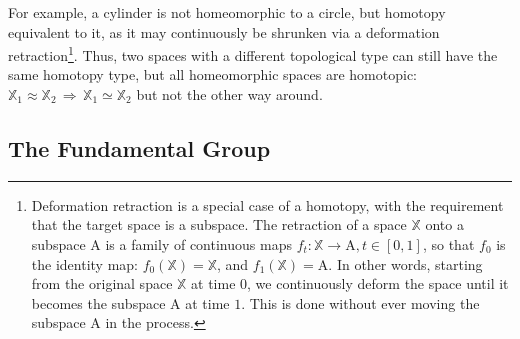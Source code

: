 For example, a cylinder is not homeomorphic to a circle, but homotopy equivalent to it, as it may continuously be shrunken via a deformation retraction\footnote{ Deformation retraction is a special case of a homotopy, with the requirement that the target space is a subspace. The retraction of a space $\mathbb{X}$ onto a subspace $\mathrm{A}$ is a family of continuous maps $f_{t}: \mathbb{X} \rightarrow \mathrm{A}, t \in [0,1]$, so that $f_{0}$ is the identity map: $f_{0}(\mathbb{X}) = \mathbb{X}$, and $f_{1}(\mathbb{X}) = \mathrm{A}$. In other words, starting from the original space $\mathbb{X}$ at time $0$, we continuously deform the space until it becomes the subspace $\mathrm{A}$ at time $1$. This is done without ever moving the subspace $\mathrm{A}$ in the process.}.
Thus, two spaces with a different topological type can still have the same homotopy type, but all homeomorphic spaces are homotopic: $\mathbb{X}_{1} \approx \mathbb{X}_{2} \, \Rightarrow \, \mathbb{X}_{1} \simeq \mathbb{X}_{2}$ but not the other way around.

\subsection{The Fundamental Group}
\label{math_fundamental_group}

